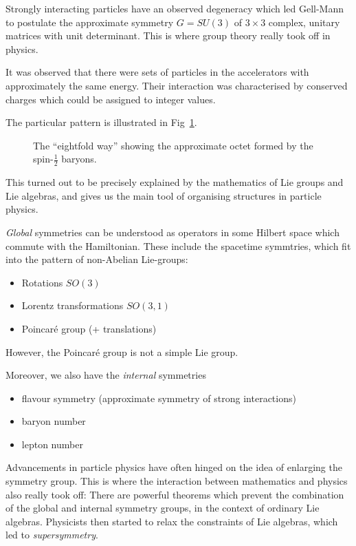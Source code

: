 \begin{example}
Strongly interacting particles have an observed degeneracy which led Gell-Mann to postulate the approximate symmetry $G = SU(3)$ of $3\times 3$ complex, unitary matrices with unit determinant.
This is where group theory really took off in physics.

It was observed that there were sets of particles in the accelerators with approximately the same energy. Their interaction was characterised by conserved charges which could be assigned to integer values.

  The particular pattern is illustrated in Fig~\ref{fig:eightfold}.

  \begin{figure}[htpb]
    \centering
    \def\svgwidth{0.5\columnwidth}
    
    \caption{The ``eightfold way'' showing the approximate octet formed by the spin-$\frac{1}{2}$ baryons.}
    \label{fig:eightfold}
  \end{figure}
This turned out to be precisely explained by the mathematics of Lie groups and Lie algebras, and gives us the main tool of organising structures in particle physics.
\end{example} 

\begin{definition}
  \emph{Global} symmetries can be understood as operators in some Hilbert space which commute with the Hamiltonian.
  These include the spacetime symmtries, which fit into the pattern of non-Abelian Lie-groups:
  \begin{itemize}
    \item Rotations $SO(3)$
    \item Lorentz transformations $SO(3, 1)$
    \item Poincar\'e group (+ translations)
  \end{itemize}
  However, the Poincar\'e group is not a simple Lie group. 
\end{definition}
Moreover, we also have the \emph{internal} symmetries
\begin{itemize}
  \item flavour symmetry (approximate symmetry of strong interactions)
  \item baryon number
  \item lepton number
\end{itemize}
Advancements in particle physics have often hinged on the idea of enlarging the symmetry group. This is where the interaction between mathematics and physics also really took off: There are powerful theorems which prevent the combination of the global and internal symmetry groups, in the context of ordinary Lie algebras.
Physicists then started to relax the constraints of Lie algebras, which led to \emph{supersymmetry}.

